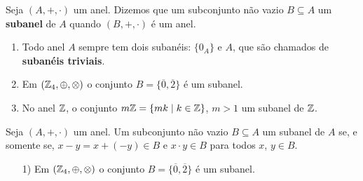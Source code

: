 \documentclass{beamer}
\begin{document}
    \begin{frame}
        \begin{definicao}
            Seja $(A, +, \cdot)$ um anel. \pause Dizemos que um subconjunto n{\~a}o vazio \pause $B\subseteq A$  um \textbf{subanel} de $A$ \pause quando $(B, +, \cdot)$ \'e um anel.\pause
        \end{definicao}

        \begin{exemplos}
            \begin{enumerate}[label={\arabic*})]
                \item Todo anel $A$ sempre tem dois suban{\'e}is: \pause $\{0_{A}\}$ \pause e $A$, \pause que s{\~a}o chamados de \textbf{suban{\'e}is triviais}.\pause

                \vspace{.5cm}

                \item Em $(\mathbb{Z}_4,\oplus,\otimes)$ \pause o conjunto $B = \{\overline{0}, \overline{2}\}$ \'e um subanel.\pause

                \vspace{.5cm}

                \item No anel $\mathbb{Z}$, \pause o conjunto $m\mathbb{Z} = \{mk \mid k \in \mathbb{Z}\}$, $m > 1$  um subanel de $\mathbb{Z}$.\pause

                \vspace{.5cm}
            \end{enumerate}
        \end{exemplos}
    \end{frame}

    \begin{frame}
        \begin{proposicao}
            Seja $(A, +,\cdot)$ um anel. \pause Um subconjunto n{\~a}o vazio \pause $B\subseteq A$  um subanel de $A$ \pause se, e somente se, \pause $x - y = x + (-y) \in B$ \pause e $x\cdot y \in B$ \pause para todos $x$, $y \in B$.\pause
        \end{proposicao}
    \end{frame}

    \begin{frame}
        \begin{exemplos}
            \begin{enumerate}
                \item[1)] Em $(\mathbb{Z}_4,\oplus,\otimes)$ \pause o conjunto $B = \{\overline{0}, \overline{2}\}$ \'e um subanel.\pause

                \vspace{5cm}
            \end{enumerate}
        \end{exemplos}
    \end{frame}
\end{document}
